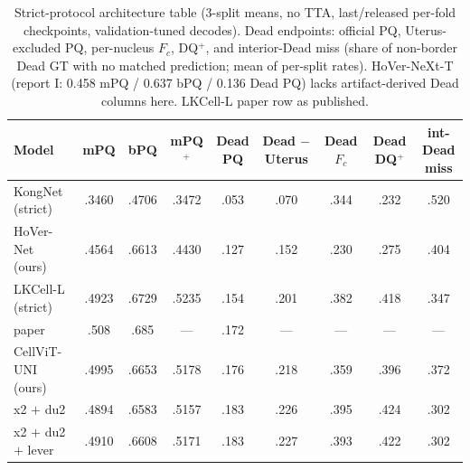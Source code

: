 \documentclass[11pt]{article}
\begin{document}
\begin{table}[t]
\centering\small
\caption{Strict-protocol architecture table (3-split means, no TTA, last/released per-fold
checkpoints, validation-tuned decodes). Dead endpoints: official PQ, Uterus-excluded PQ,
per-nucleus $F_c$, DQ$^+$, and interior-Dead miss (share of non-border Dead GT with no
matched prediction; mean of per-split rates). HoVer-NeXt-T (report I: 0.458 mPQ / 0.637 bPQ
/ 0.136 Dead PQ) lacks artifact-derived Dead columns here. LKCell-L paper row as published.}
\label{tab:arch}
\begin{tabular}{lcccccccc}
\toprule
Model & mPQ & bPQ & mPQ$^+$ & \shortstack{Dead\\PQ} & \shortstack{Dead\\$-$Uterus} & \shortstack{Dead\\$F_c$} & \shortstack{Dead\\DQ$^+$} & \shortstack{int-Dead\\miss} \\
\midrule
KongNet (strict)     & .3460 & .4706 & .3472 & .053 & .070 & .344 & .232 & .520 \\
HoVer-Net (ours)     & .4564 & .6613 & .4430 & .127 & .152 & .230 & .275 & .404 \\
LKCell-L (strict)    & .4923 & .6729 & .5235 & .154 & .201 & .382 & .418 & .347 \\
\quad paper          & .508 & .685 & --- & .172 & --- & --- & --- & --- \\
CellViT-UNI (ours)   & .4995 & .6653 & .5178 & .176 & .218 & .359 & .396 & .372 \\
\midrule
x2 $+$ du2           & .4894 & .6583 & .5157 & .183 & .226 & .395 & .424 & .302 \\
x2 $+$ du2 $+$ lever & .4910 & .6608 & .5171 & .183 & .227 & .393 & .422 & .302 \\
\bottomrule
\end{tabular}
\end{table}
\end{document}
